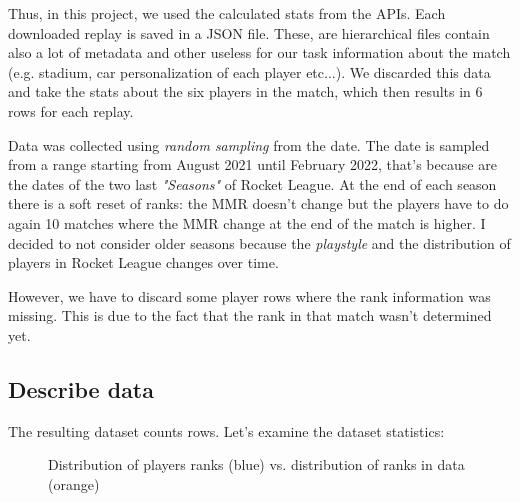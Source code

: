 Thus, in this project, we used the calculated stats from the APIs. Each downloaded replay is saved in a JSON file. These, are hierarchical files contain also a lot of metadata and other useless for our task information about the match (e.g. stadium, car personalization of each player etc...). We discarded this data and take the stats about the six players in the match, which then results in 6 rows for each replay.

Data was collected using \textit{random sampling} from the date. The date is sampled from a range starting from August 2021 until February 2022, that's because are the dates of the two last \textit{"Seasons"} of Rocket League. At the end of each season there is a soft reset of ranks: the MMR doesn't change but the players have to do again 10 matches where the MMR change at the end of the match is higher.
I decided to not consider older seasons because the \textit{playstyle} and the distribution of players in Rocket League changes over time.

However, we have to discard some player rows where the rank information was missing. This is due to the fact that the rank in that match wasn't determined yet.

\subsection{Describe data}

The resulting dataset counts  rows. Let's examine the dataset statistics:

\begin{figure}[H]
    \label{fig:rank_distr}
    \caption{Distribution of players ranks (blue) vs. distribution of ranks in data (orange)}
\end{figure}

